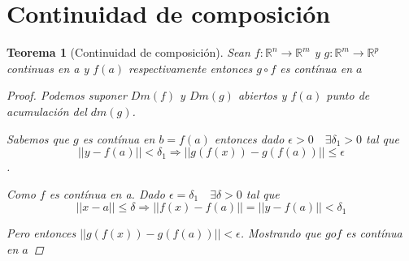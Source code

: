 \documentclass{article}
\theoremstyle{break}
\newtheorem{theorem}{Teorema}[section]
\begin{document}
\section{Continuidad de composición}
\begin{theorem}[Continuidad de composición]
  Sean $f:\mathbb{R}^{n} \rightarrow \mathbb{R}^{m} $ y $g:\mathbb{R}^{m} \longrightarrow \mathbb{R}^{p} $ 
  continuas en a y $f(a)$ respectivamente entonces $g\circ f$ es contínua en $a$
  \begin{proof}
    Podemos suponer $Dm(f)$ y $Dm(g)$ abiertos y $f(a)$ punto de acumulación del $dm(g)$.

    Sabemos que $g$ es contínua en $b=f(a)$ entonces dado $\epsilon >0 \quad \exists \delta_1>0$ tal que
    $$||y-f(a)|| < \delta_1 \Longrightarrow ||g(f(x))-g(f(a))|| \leq \epsilon $$.

    Como $f$ es contínua en a. Dado $\epsilon = \delta_1 \quad \exists \delta >0$ tal que
    $$||x-a||\leq \delta \Longrightarrow ||f(x) - f(a)||=||y-f(a)|| < \delta_1$$

    Pero entonces $||g(f(x))-g(f(a))|| < \epsilon$. Mostrando que $gof$ es contínua en $a$
  \end{proof}
\end{theorem}
\end{document}
